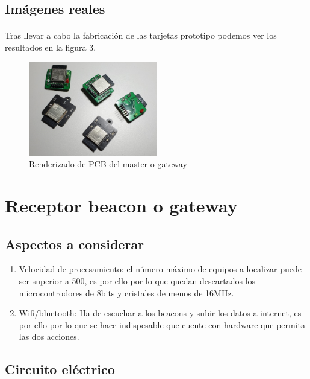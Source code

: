 \documentclass[paper=a4, fontsize=11pt,twoside]{scrartcl}	%
\begin{document}
    \subsection{Imágenes reales}
        \paragraph{}
        Tras llevar a cabo la fabricación de las tarjetas prototipo podemos ver los resultados en la figura 3.
        \begin{center}
            \begin{figure}[ht]
                \centering
                \includegraphics[width=0.5\textwidth]{../real_beacon_pcb.jpeg}
                \caption{Renderizado de PCB del master o gateway}
                \label{fig:mesh3}
            \end{figure}    
        \end{center}       
\section{Receptor beacon o gateway}
    \subsection{Aspectos a considerar}
        \begin{enumerate}
            \item Velocidad de procesamiento: el número máximo de equipos a localizar puede ser superior a 500, es por ello 
            por lo que quedan descartados los microcontrodores de 8bits y cristales de menos de 16MHz.
            \item Wifi/bluetooth: Ha de escuchar a los beacons y subir los datos a internet, es por ello por lo que se hace 
            indispesable que cuente con hardware que permita las dos acciones.
        \end{enumerate}

    \subsection{Circuito eléctrico}
\end{document}
